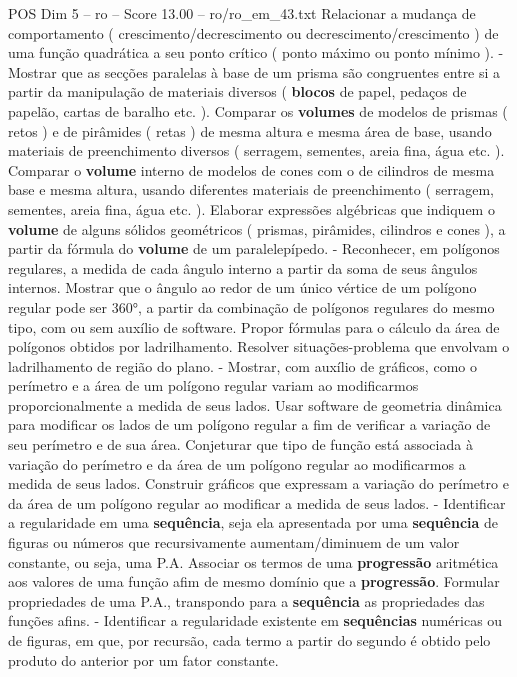 \begin{textsample}{POS Dim 5 – ro – Score 13.00 – ro/ro\_em\_43.txt}
Relacionar a mudança de comportamento ( crescimento/decrescimento ou decrescimento/crescimento ) de uma função quadrática a seu ponto crítico ( ponto máximo ou ponto mínimo ). - Mostrar que as secções paralelas à base de um prisma são congruentes entre si a partir da manipulação de materiais diversos ( \textbf{blocos} de papel, pedaços de papelão, cartas de baralho etc. ).
Comparar os \textbf{volumes} de modelos de prismas ( retos ) e de pirâmides ( retas ) de mesma altura e mesma área de base, usando materiais de preenchimento diversos ( serragem, sementes, areia fina, água etc. ).
Comparar o \textbf{volume} interno de modelos de cones com o de cilindros de mesma base e mesma altura, usando diferentes materiais de preenchimento ( serragem, sementes, areia fina, água etc. ).
Elaborar expressões algébricas que indiquem o \textbf{volume} de alguns sólidos geométricos ( prismas, pirâmides, cilindros e cones ), a partir da fórmula do \textbf{volume} de um paralelepípedo. - Reconhecer, em polígonos regulares, a medida de cada ângulo interno a partir da soma de seus ângulos internos.
Mostrar que o ângulo ao redor de um único vértice de um polígono regular pode ser 360{\EmojiFont °}, a partir da combinação de polígonos regulares do mesmo tipo, com ou sem auxílio de software.
Propor fórmulas para o cálculo da área de polígonos obtidos por ladrilhamento.
Resolver situações-problema que envolvam o ladrilhamento de região do plano. - Mostrar, com auxílio de gráficos, como o perímetro e a área de um polígono regular variam ao modificarmos proporcionalmente a medida de seus lados.
Usar software de geometria dinâmica para modificar os lados de um polígono regular a fim de verificar a variação de seu perímetro e de sua área.
Conjeturar que tipo de função está associada à variação do perímetro e da área de um polígono regular ao modificarmos a medida de seus lados.
Construir gráficos que expressam a variação do perímetro e da área de um polígono regular ao modificar a medida de seus lados. - Identificar a regularidade em uma \textbf{sequência}, seja ela apresentada por uma \textbf{sequência} de figuras ou números que recursivamente aumentam/diminuem de um valor constante, ou seja, uma P.A.
Associar os termos de uma \textbf{progressão} aritmética aos valores de uma função afim de mesmo domínio que a \textbf{progressão}.
Formular propriedades de uma P.A., transpondo para a \textbf{sequência} as propriedades das funções afins. - Identificar a regularidade existente em \textbf{sequências} numéricas ou de figuras, em que, por recursão, cada termo a partir do segundo é obtido pelo produto do anterior por um fator constante.

\end{textsample}
